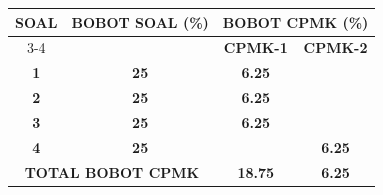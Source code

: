 \documentclass[11pt,letterpaper]{article}
\begin{document}
\begin{center}
  \begin{tabular}{|c|c|c|c|}
    \hline
    \multirow{2}{*}{\textbf{SOAL}}                  & \multirow{2}{*}{\textbf{BOBOT SOAL (\%)}} & \multicolumn{2}{c|}{\textbf{BOBOT CPMK (\%)}}                   \\ \cline{3-4}
                                                    &                                           & \textbf{CPMK-1}                               & \textbf{CPMK-2} \\ \hline
    \textbf{1}                                      & \textbf{25}                               & \textbf{6.25}                                 &                 \\ \hline
    \textbf{2}                                      & \textbf{25}                               & \textbf{6.25}                                 &                 \\ \hline
    \textbf{3}                                      & \textbf{25}                               & \textbf{6.25}                                 &                 \\ \hline
    \textbf{4}                                      & \textbf{25}                               &                                               & \textbf{6.25}   \\ \hline
    \multicolumn{2}{|c|}{\textbf{TOTAL BOBOT CPMK}} & \textbf{18.75}                            & \textbf{6.25}                                                   \\ \hline
  \end{tabular}
\end{center}

\vspace{0.25cm}
\end{document}
